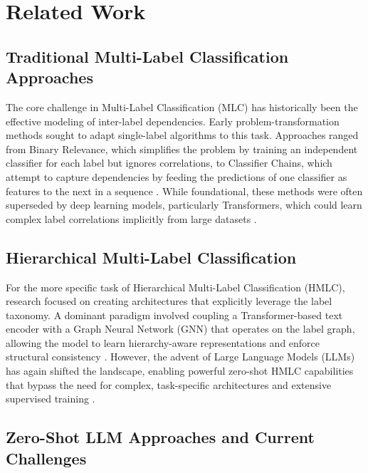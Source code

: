 \section{Related Work}

\subsection{Traditional Multi-Label Classification Approaches}

The core challenge in Multi-Label Classification (MLC) has historically been the effective modeling of inter-label dependencies. Early problem-transformation methods sought to adapt single-label algorithms to this task. Approaches ranged from Binary Relevance, which simplifies the problem by training an independent classifier for each label but ignores correlations, to Classifier Chains, which attempt to capture dependencies by feeding the predictions of one classifier as features to the next in a sequence \citep{zhang_binary_2018,Read2011}. While foundational, these methods were often superseded by deep learning models, particularly Transformers, which could learn complex label correlations implicitly from large datasets \citep{devlin_bert_2019}.

\subsection{Hierarchical Multi-Label Classification}

For the more specific task of Hierarchical Multi-Label Classification (HMLC), research focused on creating architectures that explicitly leverage the label taxonomy. A dominant paradigm involved coupling a Transformer-based text encoder with a Graph Neural Network (GNN) that operates on the label graph, allowing the model to learn hierarchy-aware representations and enforce structural consistency \citep{zhou-etal-2020-hierarchy,xu-etal-2021-hierarchical}. However, the advent of Large Language Models (LLMs) has again shifted the landscape, enabling powerful zero-shot HMLC capabilities that bypass the need for complex, task-specific architectures and extensive supervised training \citep{wang-etal-2023-text2topic}.

\subsection{Zero-Shot LLM Approaches and Current Challenges}

